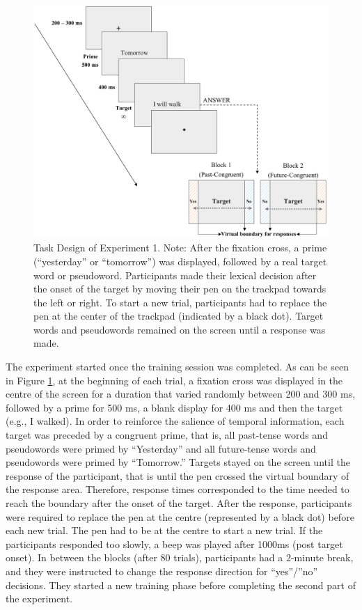 \documentclass[
  a4paper,12pt,twoside,onecolumn,openright,final,oldfontcommands]{memoir}
\begin{document}
\begin{figure}[htbp!]

{\centering \includegraphics[width=1\linewidth]{figures/chap-3-fig2} 

}

\caption{Task Design of Experiment 1. Note: After the fixation cross, a prime (“yesterday” or “tomorrow”) was displayed, followed by a real target word or pseudoword. Participants made their lexical decision after the onset of the target by moving their pen on the trackpad towards the left or right. To start a new trial, participants had to replace the pen at the center of the trackpad (indicated by a black dot). Target words and pseudowords remained on the screen until a response was made.}\label{fig:chap-3-fig2}
\end{figure}

The experiment started once the training session was completed. As can be seen in Figure \ref{fig:chap-3-fig2}, at the beginning of each trial, a fixation cross was displayed in the centre of the screen for a duration that varied randomly between 200 and 300 ms, followed by a prime for 500 ms, a blank display for 400 ms and then the target (e.g., I walked). In order to reinforce the salience of temporal information, each target was preceded by a congruent prime, that is, all past-tense words and pseudowords were primed by ``Yesterday'' and all future-tense words and pseudowords were primed by ``Tomorrow.'' Targets stayed on the screen until the response of the participant, that is until the pen crossed the virtual boundary of the response area. Therefore, response times corresponded to the time needed to reach the boundary after the onset of the target. After the response, participants were required to replace the pen at the centre (represented by a black dot) before each new trial. The pen had to be at the centre to start a new trial. If the participants responded too slowly, a beep was played after 1000ms (post target onset). In between the blocks (after 80 trials), participants had a 2-minute break, and they were instructed to change the response direction for ``yes''/''no'' decisions. They started a new training phase before completing the second part of the experiment.
\end{document}
